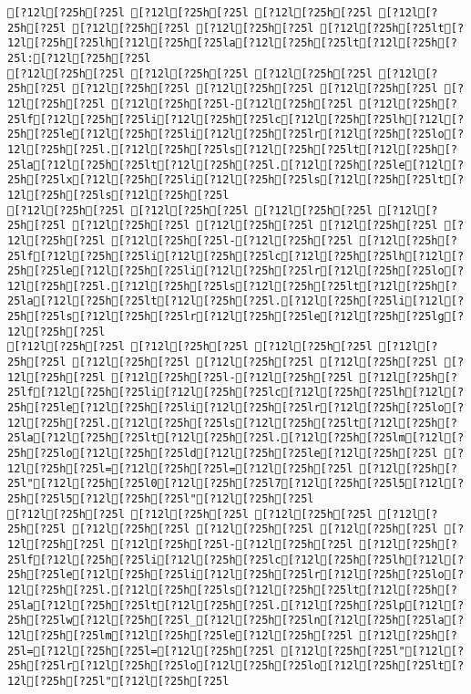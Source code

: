 \documentclass{scrartcl}
\begin{document}
\begin{Verbatim}
[?12l[?25h[?25l [?12l[?25h[?25l [?12l[?25h[?25l [?12l[?25h[?25l [?12l[?25h[?25l [?12l[?25h[?25l [?12l[?25h[?25lt[?12l[?25h[?25lh[?12l[?25h[?25la[?12l[?25h[?25lt[?12l[?25h[?25l:[?12l[?25h[?25l
[?12l[?25h[?25l [?12l[?25h[?25l [?12l[?25h[?25l [?12l[?25h[?25l [?12l[?25h[?25l [?12l[?25h[?25l [?12l[?25h[?25l [?12l[?25h[?25l [?12l[?25h[?25l-[?12l[?25h[?25l [?12l[?25h[?25lf[?12l[?25h[?25li[?12l[?25h[?25lc[?12l[?25h[?25lh[?12l[?25h[?25le[?12l[?25h[?25li[?12l[?25h[?25lr[?12l[?25h[?25lo[?12l[?25h[?25l.[?12l[?25h[?25ls[?12l[?25h[?25lt[?12l[?25h[?25la[?12l[?25h[?25lt[?12l[?25h[?25l.[?12l[?25h[?25le[?12l[?25h[?25lx[?12l[?25h[?25li[?12l[?25h[?25ls[?12l[?25h[?25lt[?12l[?25h[?25ls[?12l[?25h[?25l
[?12l[?25h[?25l [?12l[?25h[?25l [?12l[?25h[?25l [?12l[?25h[?25l [?12l[?25h[?25l [?12l[?25h[?25l [?12l[?25h[?25l [?12l[?25h[?25l [?12l[?25h[?25l-[?12l[?25h[?25l [?12l[?25h[?25lf[?12l[?25h[?25li[?12l[?25h[?25lc[?12l[?25h[?25lh[?12l[?25h[?25le[?12l[?25h[?25li[?12l[?25h[?25lr[?12l[?25h[?25lo[?12l[?25h[?25l.[?12l[?25h[?25ls[?12l[?25h[?25lt[?12l[?25h[?25la[?12l[?25h[?25lt[?12l[?25h[?25l.[?12l[?25h[?25li[?12l[?25h[?25ls[?12l[?25h[?25lr[?12l[?25h[?25le[?12l[?25h[?25lg[?12l[?25h[?25l
[?12l[?25h[?25l [?12l[?25h[?25l [?12l[?25h[?25l [?12l[?25h[?25l [?12l[?25h[?25l [?12l[?25h[?25l [?12l[?25h[?25l [?12l[?25h[?25l [?12l[?25h[?25l-[?12l[?25h[?25l [?12l[?25h[?25lf[?12l[?25h[?25li[?12l[?25h[?25lc[?12l[?25h[?25lh[?12l[?25h[?25le[?12l[?25h[?25li[?12l[?25h[?25lr[?12l[?25h[?25lo[?12l[?25h[?25l.[?12l[?25h[?25ls[?12l[?25h[?25lt[?12l[?25h[?25la[?12l[?25h[?25lt[?12l[?25h[?25l.[?12l[?25h[?25lm[?12l[?25h[?25lo[?12l[?25h[?25ld[?12l[?25h[?25le[?12l[?25h[?25l [?12l[?25h[?25l=[?12l[?25h[?25l=[?12l[?25h[?25l [?12l[?25h[?25l"[?12l[?25h[?25l0[?12l[?25h[?25l7[?12l[?25h[?25l5[?12l[?25h[?25l5[?12l[?25h[?25l"[?12l[?25h[?25l
[?12l[?25h[?25l [?12l[?25h[?25l [?12l[?25h[?25l [?12l[?25h[?25l [?12l[?25h[?25l [?12l[?25h[?25l [?12l[?25h[?25l [?12l[?25h[?25l [?12l[?25h[?25l-[?12l[?25h[?25l [?12l[?25h[?25lf[?12l[?25h[?25li[?12l[?25h[?25lc[?12l[?25h[?25lh[?12l[?25h[?25le[?12l[?25h[?25li[?12l[?25h[?25lr[?12l[?25h[?25lo[?12l[?25h[?25l.[?12l[?25h[?25ls[?12l[?25h[?25lt[?12l[?25h[?25la[?12l[?25h[?25lt[?12l[?25h[?25l.[?12l[?25h[?25lp[?12l[?25h[?25lw[?12l[?25h[?25l_[?12l[?25h[?25ln[?12l[?25h[?25la[?12l[?25h[?25lm[?12l[?25h[?25le[?12l[?25h[?25l [?12l[?25h[?25l=[?12l[?25h[?25l=[?12l[?25h[?25l [?12l[?25h[?25l"[?12l[?25h[?25lr[?12l[?25h[?25lo[?12l[?25h[?25lo[?12l[?25h[?25lt[?12l[?25h[?25l"[?12l[?25h[?25l

\end{Verbatim}
\end{document}

